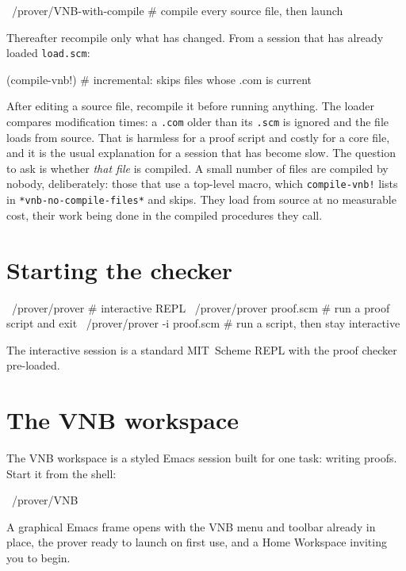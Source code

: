 \begin{VNBsnip}
~/prover/VNB-with-compile    # compile every source file, then launch
\end{VNBsnip}

Thereafter recompile only what has changed.  From a session that has already
loaded \texttt{load.scm}:

\begin{VNBsnip}
(compile-vnb!)               # incremental: skips files whose .com is current
\end{VNBsnip}

After editing a source file, recompile it before running anything.  The
loader compares modification times: a \texttt{.com} older than its
\texttt{.scm} is ignored and the file loads from source.  That is harmless
for a proof script and costly for a core file, and it is the usual
explanation for a session that has become slow.  The question to ask is
whether \emph{that file} is compiled.  A small number of files are compiled
by nobody, deliberately: those that use a top-level macro, which
\texttt{compile-vnb!} lists in \texttt{*vnb-no-compile-files*} and skips.  They
load from source at no measurable cost, their work being done in the compiled
procedures they call.

\section{Starting the checker}

\begin{VNBsnip}
~/prover/prover              # interactive REPL
~/prover/prover proof.scm    # run a proof script and exit
~/prover/prover -i proof.scm # run a script, then stay interactive
\end{VNBsnip}

The interactive session is a standard MIT~Scheme REPL with the proof
checker pre-loaded.
\section{The VNB workspace}
\label{sec:emacs}

The VNB workspace is a styled Emacs session built for one task:
writing proofs.  Start it from the shell:

\begin{VNBsnip}
~/prover/VNB
\end{VNBsnip}

\noindent
A graphical Emacs frame opens with the VNB menu and toolbar already
in place, the prover ready to launch on first use, and a Home
Workspace inviting you to begin.

